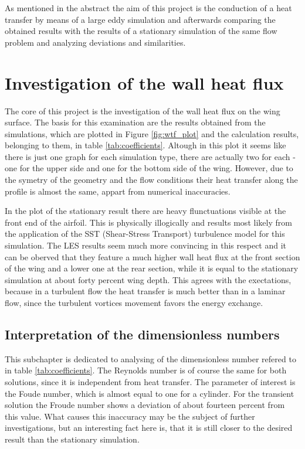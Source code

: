 As mentioned in the abstract the aim of this project is the conduction of a heat transfer by means of a large eddy simulation and afterwards comparing the obtained results with the results of a stationary simulation of the same flow problem and analyzing deviations and similarities.
\section{Investigation of the wall heat flux}
The core of this project is the investigation of the wall heat flux on the wing surface. The basis for this examination are the results obtained from the simulations, which are plotted in Figure \ref{fig:wtf_plot} and the calculation results, belonging to them, in table \ref{tab:coefficients}. Altough in this plot it seems like there is just one graph for each simulation type, there are actually two for each - one for the upper side and one for the bottom side of the wing. However, due to the symetry of the geometry and the flow conditions their heat transfer along the profile is almost the same, appart from numerical inaccuracies.
	
In the plot of the stationary result there are heavy flunctuations visible at the front end of the airfoil. This is physically illogically and results most likely from the application of the SST (Shear-Stress Transport) turbulence model for this simulation. The LES results seem much more convincing in this respect and it can be oberved that they feature a much higher wall heat flux at the front section of the wing and a lower one at the rear section, while it is equal to the stationary simulation at about forty percent wing depth. This agrees with the exectations, because in a turbulent flow the heat transfer is much better than in a laminar flow, since the turbulent vortices movement favors the energy exchange.
\subsection{Interpretation of the dimensionless numbers}
This subchapter is dedicated to analysing of the dimensionless number refered to in table \ref{tab:coefficients}. The Reynolds number is of course the same for both solutions, since it is independent from heat transfer.
The parameter of interest is the Foude number, which is almost equal to one for a cylinder. For the transient solution the Froude number shows a deviation of about fourteen percent from this value. What causes this inaccuracy may be the subject of further investigations, but an interesting fact here is, that it is still closer to the desired result than the stationary simulation.
